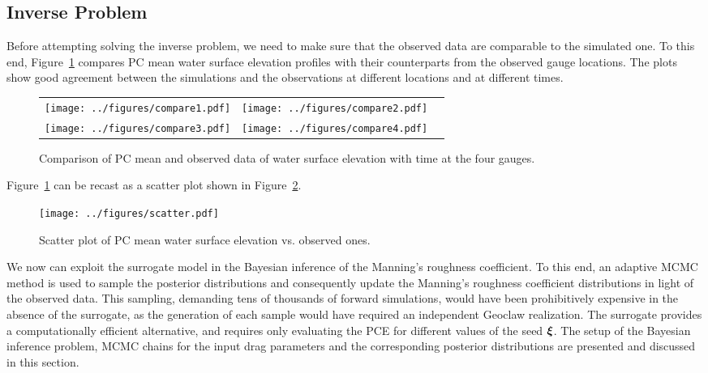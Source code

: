 \subsection{Inverse Problem} 
\label{sec:inverse}

Before attempting solving the inverse problem,
we need to make sure that the observed data are
comparable to the simulated one.
To this end, Figure~\ref{fig:compare}
compares PC mean water surface elevation profiles
with their counterparts from the observed gauge locations.
The plots show good agreement between the simulations and the observations at different
locations and at different times. 
%
\begin{figure}[h]
\begin{tabular}{clc}
%        
\texttt{[image: ../figures/compare1.pdf]} &
\texttt{[image: ../figures/compare2.pdf]} \\
\texttt{[image: ../figures/compare3.pdf]} &
\texttt{[image: ../figures/compare4.pdf]}
\end{tabular}
\caption{Comparison of PC mean 
and observed data of water surface elevation with time at the four gauges.}
\label{fig:compare}
\end{figure}     

Figure~\ref{fig:compare} can be recast as a scatter plot shown in 
Figure~\ref{fig:scatter}.
\begin{figure}[h]
\centering
\texttt{[image: ../figures/scatter.pdf]} 
\caption{Scatter plot of PC mean water surface elevation vs. observed ones.}
\label{fig:scatter}

\end{figure}        

We now can exploit the surrogate model in the Bayesian inference of the Manning's 
roughness coefficient.  To this end, an adaptive MCMC method is used to sample 
the posterior distributions \citep{Gareth2009,Haario2001} and consequently 
update the Manning's roughness coefficient distributions in light of the 
observed data. This sampling, demanding tens of thousands of forward simulations, 
would have been prohibitively expensive in the
absence of the surrogate, as the generation of each sample would have required an
independent Geoclaw realization. The surrogate provides a computationally
efficient alternative, and requires only evaluating the PCE for different values 
of the seed $\xxi$. The setup of the Bayesian inference problem,
MCMC chains for the input drag parameters and the corresponding posterior distributions are 
presented and discussed in this section. 




